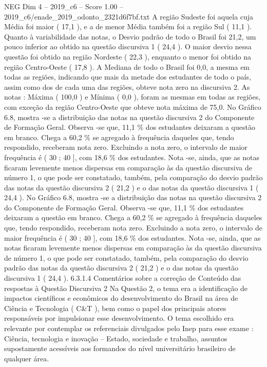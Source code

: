 \begin{textsample}{NEG Dim 4 – 2019\_c6 – Score 1.00 – 2019\_c6/enade\_2019\_odonto\_2321d6f7bf.txt}
A região Sudeste foi aquela cuja Média foi maior ( 17,1 ), e a de menor Média também foi a região Sul ( 11,1 ).
Quanto à variabilidade das notas, o Desvio padrão de todo o Brasil foi 21,2, um pouco inferior ao obtido na questão discursiva 1 ( 24,4 ).
O maior desvio nessa questão foi obtido na região Nordeste ( 22,3 ), enquanto o menor foi obtido na região Centro-Oeste ( 17,8 ).
A Mediana de todo o Brasil foi 0,0, a mesma em todas as regiões, indicando que mais da metade dos estudantes de todo o país, assim como dos de cada uma das regiões, obteve nota zero na discursiva 2.
As notas : Máxima ( 100,0 ) e Mínima ( 0,0 ), foram as mesmas em todas as regiões, com exceção da região Centro-Oeste que obteve nota máxima de 75,0.
No Gráfico 6.8, mostra -se a distribuição das notas na questão discursiva 2 do Componente de Formação Geral.
Observa -se que, 11,1 \% dos estudantes deixaram a questão em branco.
Chega a 60,2 \% se agregado à frequência daqueles que, tendo respondido, receberam nota zero.
Excluindo a nota zero, o intervalo de maior frequência é ( 30 ; 40 ], com 18,6 \% dos estudantes.
Nota -se, ainda, que as notas ficaram levemente menos dispersas em comparação às da questão discursiva de número 1, o que pode ser constatado, também, pela comparação do desvio padrão das notas da questão discursiva 2 ( 21,2 ) e o das notas da questão discursiva 1 ( 24,4 ).
No Gráfico 6.8, mostra -se a distribuição das notas na questão discursiva 2 do Componente de Formação Geral.
Observa -se que, 11,1 \% dos estudantes deixaram a questão em branco.
Chega a 60,2 \% se agregado à frequência daqueles que, tendo respondido, receberam nota zero.
Excluindo a nota zero, o intervalo de maior frequência é ( 30 ; 40 ], com 18,6 \% dos estudantes.
Nota -se, ainda, que as notas ficaram levemente menos dispersas em comparação às da questão discursiva de número 1, o que pode ser constatado, também, pela comparação do desvio padrão das notas da questão discursiva 2 ( 21,2 ) e o das notas da questão discursiva 1 ( 24,4 ). 6.3.1.4 Comentários sobre a correção de Conteúdo das respostas à Questão Discursiva 2 Na Questão 2, o tema era a identificação de impactos científicos e econômicos do desenvolvimento do Brasil na área de Ciência e Tecnologia ( C\&T ), bem como o papel dos principais atores responsáveis por impulsionar esse desenvolvimento.
O tema escolhido era relevante por contemplar os referenciais divulgados pelo Inep para esse exame : Ciência, tecnologia e inovação – Estado, sociedade e trabalho, assuntos supostamente acessíveis aos formandos do nível universitário brasileiro de qualquer área.

\end{textsample}
